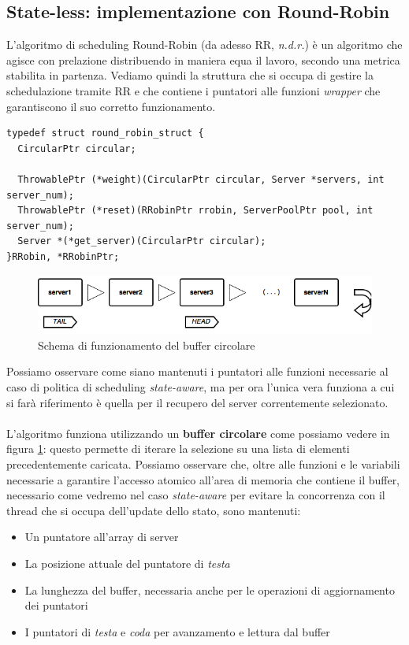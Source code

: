 \documentclass[italian]{tktltiki2}
\begin{document}
\subsection{State-less: implementazione con Round-Robin}
L'algoritmo di scheduling Round-Robin (da adesso RR, \emph{n.d.r.}) è un algoritmo che agisce con prelazione distribuendo in maniera equa il lavoro, secondo una metrica stabilita in partenza. Vediamo quindi la struttura che si occupa di gestire la schedulazione tramite RR e che contiene i puntatori alle funzioni \emph{wrapper} che garantiscono il suo corretto funzionamento.\\
\begin{lstlisting}
typedef struct round_robin_struct {
  CircularPtr circular;

  ThrowablePtr (*weight)(CircularPtr circular, Server *servers, int server_num);
  ThrowablePtr (*reset)(RRobinPtr rrobin, ServerPoolPtr pool, int server_num);
  Server *(*get_server)(CircularPtr circular);
}RRobin, *RRobinPtr;

\end{lstlisting}
\begin{figure}[b]
\centering
\includegraphics[width=\textwidth]{images/rrobin_stateless}
\caption{Schema di funzionamento del buffer circolare \label{fig: rrobin_sl}}
\end{figure}
Possiamo osservare come siano mantenuti i puntatori alle funzioni necessarie al caso di politica di scheduling \emph{state-aware}, ma per ora l'unica vera funziona a cui si farà riferimento è quella per il recupero del server correntemente selezionato. \\\\
L'algoritmo funziona utilizzando un \textbf{buffer circolare} come possiamo vedere in figura \ref{fig: rrobin_sl}: questo permette di iterare la selezione su una lista di elementi precedentemente caricata. Possiamo osservare che, oltre alle funzioni e le variabili necessarie a garantire l'accesso atomico all'area di memoria che contiene il buffer, necessario come vedremo nel caso \emph{state-aware} per evitare la concorrenza con il thread che si occupa dell'update dello stato, sono mantenuti:
	\begin{itemize}
  		\item Un puntatore all'array di server 
  		\item La posizione attuale del puntatore di \emph{testa} 
  		\item La lunghezza del buffer, necessaria anche per le operazioni di aggiornamento dei puntatori
  		\item I puntatori di \emph{testa} e \emph{coda} per avanzamento e lettura dal buffer
	\end{itemize}
\end{document}
